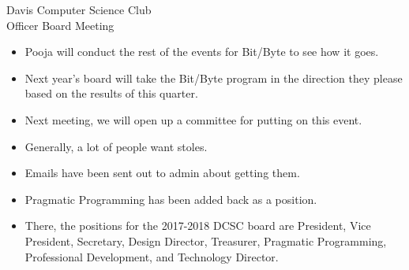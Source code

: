 \documentclass{article}
\begin{document}
\begin{Minutes}{Davis Computer Science Club\\Officer Board Meeting}
\begin{itemize}
    \item Pooja will conduct the rest of the events for Bit/Byte to see how it goes.
    \item Next year's board will take the Bit/Byte program in the direction they please based on the results of this quarter.
\end{itemize}

\begin{itemize}
    \item Next meeting, we will open up a committee for putting on this event. 
\end{itemize}

\begin{itemize}
    \item Generally, a lot of people want stoles. 
    \item Emails have been sent out to admin about getting them.
\end{itemize}

\begin{itemize}
	\item Pragmatic Programming has been added back as a position.
	\item There, the positions for the 2017-2018 DCSC board are President, Vice President, Secretary, Design Director, Treasurer, Pragmatic Programming, Professional Development, and Technology Director.
\end{itemize}
\thispagestyle{creditfooter}

\end{Minutes}
\end{document}
